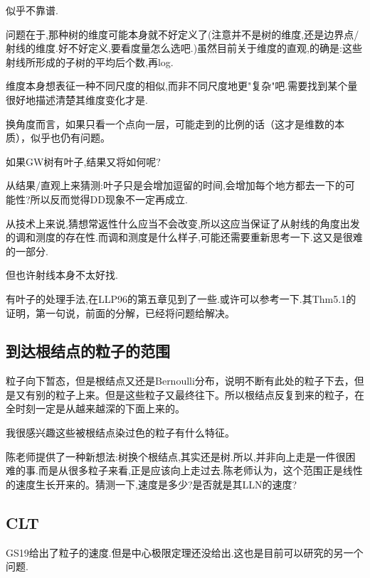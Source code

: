 \documentclass[a4paper,oneside]{ctexbook}
\begin{document}
						似乎不靠谱.

							问题在于,那种树的维度可能本身就不好定义了(注意并不是树的维度,还是边界点/射线的维度.好不好定义,要看度量怎么选吧.)虽然目前关于维度的直观,的确是:这些射线所形成的子树的平均后个数,再log.

							维度本身想表征一种不同尺度的相似,而非不同尺度地更"复杂"吧.需要找到某个量很好地描述清楚其维度变化才是.

						换角度而言，如果只看一个点向一层，可能走到的比例的话（这才是维数的本质），似乎也仍有问题。

					\begin{que}

						如果GW树有叶子,结果又将如何呢?
					
					\end{que}

						从结果/直观上来猜测:叶子只是会增加逗留的时间,会增加每个地方都去一下的可能性?所以反而觉得DD现象不一定再成立.

						从技术上来说,猜想常返性什么应当不会改变,所以这应当保证了从射线的角度出发的调和测度的存在性.而调和测度是什么样子,可能还需要重新思考一下.这又是很难的一部分.

						但也许射线本身不太好找.

						有叶子的处理手法,在LLP96的第五章见到了一些.或许可以参考一下.其Thm5.1的证明，第一句说，前面的分解，已经将问题给解决。


	\subsection{到达根结点的粒子的范围}
		
		粒子向下暂态，但是根结点又还是Bernoulli分布，说明不断有此处的粒子下去，但是又有别的粒子上来。但是这些粒子又最终往下。所以根结点反复到来的粒子，在全时刻一定是从越来越深的下面上来的。

		我很感兴趣这些被根结点染过色的粒子有什么特征。

		陈老师提供了一种新想法:树换个根结点,其实还是树.所以,并非向上走是一件很困难的事.而是从很多粒子来看,正是应该向上走过去.陈老师认为，这个范围正是线性的速度生长开来的。猜测一下,速度是多少?是否就是其LLN的速度?

	\subsection{CLT}

		GS19\cite{GS19}给出了粒子的速度.但是中心极限定理还没给出.这也是目前可以研究的另一个问题.
\end{document}
